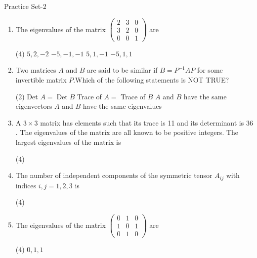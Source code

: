 \newpage
\begin{abox}
	Practice Set-2
\end{abox}
\begin{enumerate}[label=\color{ocre}\textbf{\arabic*.}]
	\item The eigenvalues of the matrix $\left(\begin{array}{lll}2 & 3 & 0 \\ 3 & 2 & 0 \\ 0 & 0 & 1\end{array}\right)$ are
	{}
	\begin{tasks}(4)
		\task[\textbf{A.}] $5,2,-2$
		\task[\textbf{B.}] $-5,-1,-1$
		\task[\textbf{C.}]  $5,1,-1$
		\task[\textbf{D.}] $-5,1,1$
	\end{tasks}
	\item Two matrices $A$ and $B$ are said to be similar if $B=P^{-1} A P$ for some invertible matrix $P$.Which of the following statements is NOT TRUE?
	{}
	\begin{tasks}(2)
		\task[\textbf{A.}] Det $A=\operatorname{Det} B$
		\task[\textbf{B.}]  Trace of $A=$ Trace of $B$
		\task[\textbf{C.}] $A$ and $B$ have the same eigenvectors
		\task[\textbf{D.}] $A$ and $B$ have the same eigenvalues
	\end{tasks}
	\item A $3 \times 3$ matrix has elements such that its trace is 11 and its determinant is 36 . The eigenvalues of the matrix are all known to be positive integers. The largest eigenvalues of the matrix is
	{}
	\begin{tasks}(4)
	\end{tasks}
	\item  The number of independent components of the symmetric tensor $A_{i j}$ with indices $i, j=1,2,3$ is
	{}
	\begin{tasks}(4)
	\end{tasks}
	\item  The eigenvalues of the matrix $\left(\begin{array}{lll}0 & 1 & 0 \\ 1 & 0 & 1 \\ 0 & 1 & 0\end{array}\right)$ are
	{}
	\begin{tasks}(4)
		\task[\textbf{A.}] $0,1,1$

\end{tasks}
\end{enumerate}
